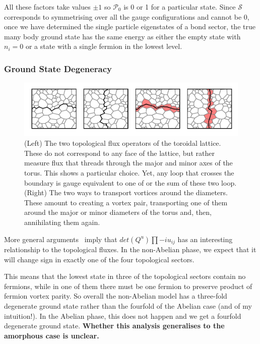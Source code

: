 All these factors take values \(\pm 1\) so \(\mathcal{P}_0\) is 0 or 1 for a particular state. Since \(\mathcal{S}\) corresponds to symmetrising over all the gauge configurations and cannot be 0, once we have determined the single particle eigenstates of a bond sector, the true many body ground state has the same energy as either the empty state with \(n_i = 0\) or a state with a single fermion in the lowest level.

\hypertarget{ground-state-degeneracy}{%
\subsubsection{Ground State Degeneracy}\label{ground-state-degeneracy}}

\hypertarget{fig:loops_and_dual_loops}{%
\begin{figure}
\centering
\includegraphics[width=1\textwidth,height=\textheight]{figure_code/amk_chapter/loops_and_dual_loops/loops_and_dual_loops}
\caption[{Topological Loops and Dual Loops}]{(Left) The two topological flux operators of the toroidal lattice. These do not correspond to any face of the lattice, but rather measure flux that threads through the major and minor axes of the torus. This shows a particular choice. Yet, any loop that crosses the boundary is gauge equivalent to one of or the sum of these two loop. (Right) The two ways to transport vortices around the diameters. These amount to creating a vortex pair, transporting one of them around the major or minor diameters of the torus and, then, annihilating them again.}
\label{fig:loops_and_dual_loops}
\end{figure}
}

More general arguments~\autocite{chungExplicitMonodromyMoore2007,oshikawaTopologicalDegeneracyNonAbelian2007} imply that \(det(Q^u) \prod -i u_{ij}\) has an interesting relationship to the topological fluxes. In the non-Abelian phase, we expect that it will change sign in exactly one of the four topological sectors.

This means that the lowest state in three of the topological sectors contain no fermions, while in one of them there must be one fermion to preserve product of fermion vortex parity. So overall the non-Abelian model has a three-fold degenerate ground state rather than the fourfold of the Abelian case (and of my intuition!). In the Abelian phase, this does not happen and we get a fourfold degenerate ground state. \textbf{Whether this analysis generalises to the amorphous case is unclear.}

